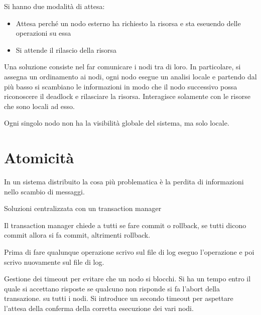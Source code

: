 Si hanno due modalità di attesa:
\begin{itemize}
    \item Attesa perché un nodo esterno ha richiesto la risorsa e sta eseuendo delle operazioni su essa
    \item Si attende il rilascio della risorsa
\end{itemize}

Una soluzione consiste nel far comunicare i nodi tra di loro. In particolare, si assegna un ordinamento 
ai nodi, ogni nodo esegue un analisi locale e partendo dal più basso si scambiano le informazioni 
in modo che il nodo successivo possa riconoscere il deadlock e rilasciare la risorsa.
Interagisce solamente con le risorse che sono locali ad esso.

Ogni singolo nodo non ha la visibilità globale del sistema, ma solo locale.
\section{Atomicità}
In un sistema distribuito la cosa più problematica è la perdita di informazioni 
nello scambio di messaggi.

Soluzioni centralizzata con un transaction manager

Il transaction manager chiede a tutti se fare commit o rollback, se tutti dicono
commit allora si fa commit, altrimenti rollback.

Prima di fare qualunque operazione scrivo sul file di log eseguo l'operazione e 
poi scrivo nuovamente sul file di log.

Gestione dei timeout per evitare che un nodo si blocchi. Si ha un tempo entro il 
quale si accettano risposte se qualcuno non risponde si fa l'abort della transazione.
su tutti i nodi. Si introduce un secondo timeout per aspettare l'attesa della 
conferma della corretta esecuzione dei vari nodi.

